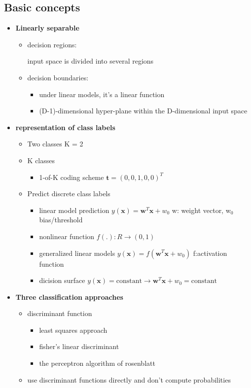 \documentclass[11pt]{article}
\newcommand{\bl}[1] {\boldsymbol{#1}}
\begin{document}
\subsection{Basic concepts}
\label{sec:orgf751c3e}
\begin{itemize}
\item \textbf{Linearly separable}
\begin{itemize}
\item decision regions:

input space is divided into several regions
\item decision boundaries:
\begin{itemize}
\item under linear models, it's a linear function
\item (D-1)-dimensional hyper-plane within the D-dimensional input space
\end{itemize}
\end{itemize}
\item \textbf{representation of class labels}
\begin{itemize}
\item Two classes K = 2
\item K classes
\begin{itemize}
\item 1-of-K coding scheme \(\bl{t}=(0,0,1,0,0)^T\)
\end{itemize}
\item Predict discrete class labels
\begin{itemize}
\item linear model prediction \(y(\bl{x})=\bl{w}^T\bl{x}+w_0\)
w: weight vector, w\(_{\text{0}}\) bias/threshold
\item nonlinear function \(f(.):R\to(0,1)\)
\item generalized linear models
\(y(\bl{x})=f(\bl{w}^T\bl{x}+w_0)\)
f:activation function
\item dicision surface
\(y(\bl{x})=\text{constant}\to \bl{w}^T\bl{x}+w_0=\text{constant}\)
\end{itemize}
\end{itemize}
\item \textbf{Three classification approaches}
\begin{itemize}
\item discriminant function
\begin{itemize}
\item least squares approach
\item fisher's linear discriminant
\item the perceptron algorithm of rosenblatt
\end{itemize}
\item use discriminant functions directly and don't compute probabilities


\end{itemize}
\end{itemize}
\end{document}
